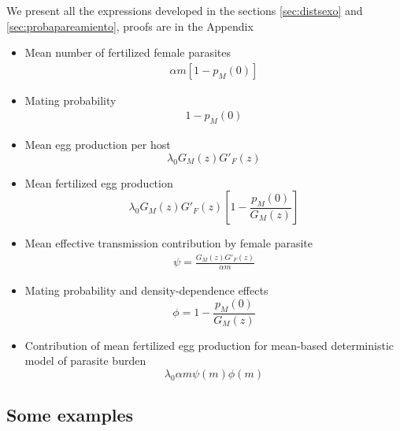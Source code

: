 \documentclass[useAMS,referee,usenatbib]{biom}
\begin{document}
We present all the expressions developed in the sections \ref{sec:distsexo} and \ref{sec:probapareamiento}, proofs  are  in the Appendix %
\begin{itemize}
	\item Mean number of fertilized female parasites
	\begin{align}
	\alpha m \left[1-p_M(0) \right] 
	\end{align}
	
	\item Mating probability 
	\begin{align}
	1-p_M(0) 
	\end{align}
	
	\item Mean egg production per host
	\begin{equation}
	\lambda_0G_M(z)G'_F(z)
	\end{equation}
	
	\item Mean fertilized egg production
	\begin{equation}
	\lambda_0 G_M(z) G'_F(z)\left[ 1-\frac{p_M(0)}{G_M(z)}\right]
	\end{equation}
	
	\item Mean effective transmission contribution by female parasite
	\begin{align}
	\psi=\frac{G_M(z)G'_F(z)}{\alpha m}
	\end{align}
	
	\item Mating probability and density-dependence effects
	\begin{equation}
	\phi= 1-\frac{p_M(0)}{G_M(z)}
	\end{equation}
	
	\item Contribution of mean fertilized egg production for mean-based deterministic model  of parasite burden
	\begin{equation}
	\lambda_0 \alpha m \psi(m) \phi(m)
	\end{equation}
\end{itemize}


\subsection{Some examples}
\end{document}
